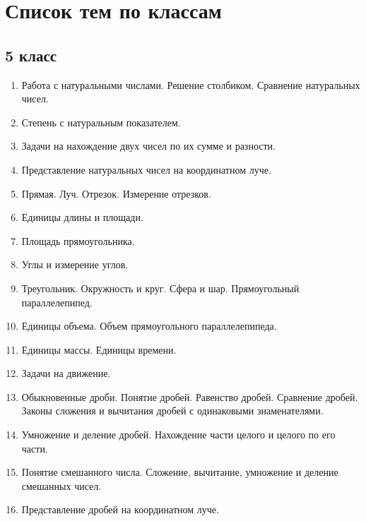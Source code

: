 \documentclass[12pt, a4paper]{article}
\begin{document}
	\section*{Список тем по классам}
		\subsection*{5 класс}
			\begin{enumerate}[label=\textbf{\arabic*}.]
				\item Работа с натуральными числами. Решение столбиком. Сравнение натуральных чисел.
				\item Степень с натуральным показателем.
				\item Задачи на нахождение двух чисел по их сумме и разности.
				\item Представление натуральных чисел на координатном луче.
				\item Прямая. Луч. Отрезок. Измерение отрезков.
				\item Единицы длины и площади.
				\item Площадь прямоугольника.
				\item Углы и измерение углов.
				\item Треугольник. Окружность и круг. Сфера и шар. Прямоугольный параллелепипед.
				\item Единицы объема. Объем прямоугольного параллелепипеда.
				\item Единицы массы. Единицы времени.
				\item Задачи на движение.
				\item Обыкновенные дроби. Понятие дробей. Равенство дробей. Сравнение дробей. Законы сложения и вычитания дробей с одинаковыми знаменателями.
				\item Умножение и деление дробей. Нахождение части целого и целого по его части.
				\item Понятие смешанного числа. Сложение, вычитание, умножение и деление смешанных чисел.
				\item Представление дробей на координатном луче.
			\end{enumerate}
\end{document}
